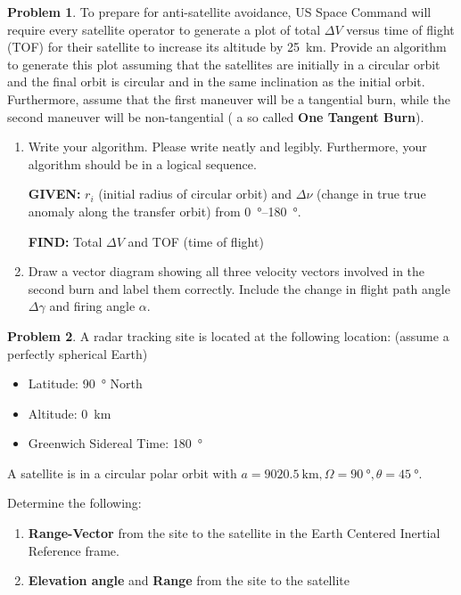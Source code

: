 \documentclass[10pt]{article}
\theoremstyle{definition}
\newtheorem{prob}{Problem}[section]
\newenvironment{subprob}%
{\renewcommand{\theenumi}{\alph{enumi}}\renewcommand{\labelenumi}{(\theenumi)}\begin{enumerate}}%
{\end{enumerate}}%
\newcommand{\extrapage}{\clearpage\newpage\null\newpage}
\begin{document}
\extrapage
\extrapage

\begin{prob}
    To prepare for anti-satellite avoidance, US Space Command will require every satellite operator to generate a plot of total \( \Delta V \) versus time of flight (TOF) for their satellite to increase its altitude by \SI{25}{\kilo\meter}. 
    Provide an algorithm to generate this plot assuming that the satellites are initially in a circular orbit and the final orbit is circular and in the same inclination as the initial orbit. 
    Furthermore, assume that the first maneuver will be a tangential burn, while the second maneuver will be non-tangential ( a so called \textbf{One Tangent Burn}).

    \begin{subprob}
    \item Write your algorithm.
        Please write neatly and legibly.
        Furthermore, your algorithm should be in a logical sequence. 

        \textbf{GIVEN:} \( r_i\) (initial radius of circular orbit) and \( \Delta \nu\) (change in true true anomaly along the transfer orbit) from \SIrange{0}{180}{\degree}.

        \textbf{FIND:} Total \( \Delta V\) and TOF (time of flight)
        
    \item Draw a vector diagram showing all three velocity vectors involved in the second burn and label them correctly.
        Include the change in flight path angle \( \Delta \gamma \) and firing angle \( \alpha \).
    \end{subprob} 
\end{prob}    

\extrapage
\extrapage

\begin{prob}
    A radar tracking site is located at the following location: (assume a perfectly spherical Earth)
    \begin{itemize}
        \item Latitude: \SI{90}{\degree} North
        \item Altitude: \SI{0}{\kilo\meter}
        \item Greenwich Sidereal Time: \SI{180}{\degree}
    \end{itemize}

    A satellite is in a circular polar orbit with \( a = \SI{9020.5}{\kilo\meter}, \Omega = \SI{90}{\degree}, \theta = \SI{45}{\degree}\).

    Determine the following:
    \begin{subprob}
    \item \textbf{Range-Vector} from the site to the satellite in the Earth Centered Inertial Reference frame.
    \item \textbf{Elevation angle} and \textbf{Range} from the site to the satellite
    \end{subprob}
\end{prob}

\extrapage
\extrapage
\end{document}
